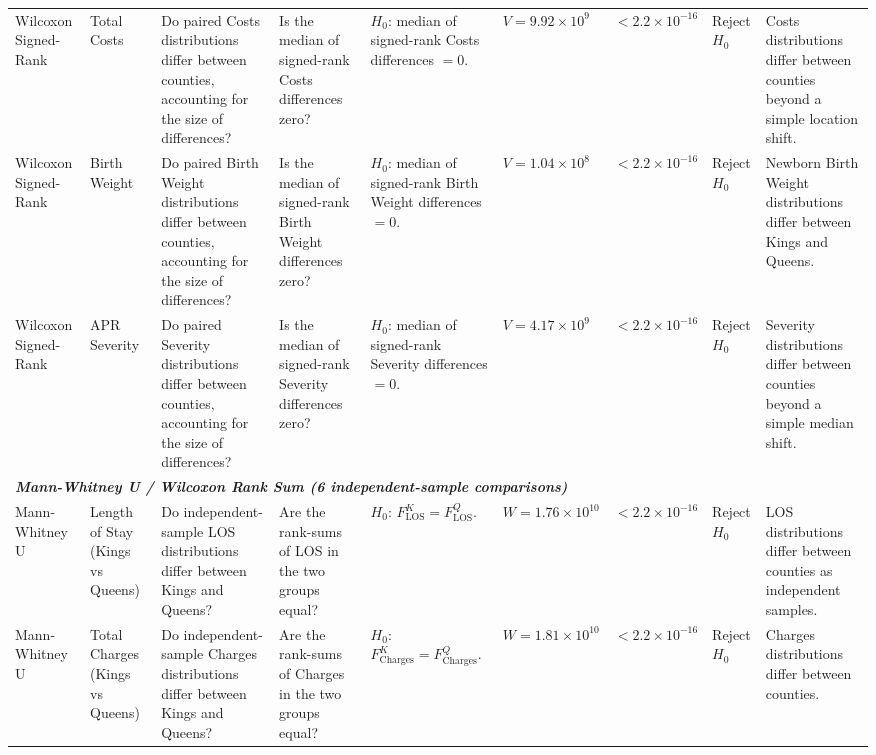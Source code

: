 \documentclass[12pt]{article}
\begin{document}
\begin{landscape}
\begin{scriptsize}
\begin{longtable}{p{2.0cm} p{2.4cm} p{3.0cm} p{2.7cm} p{2.5cm} p{1.7cm} p{1.3cm} p{1.3cm} p{3.0cm}}
Wilcoxon Signed-Rank & Total Costs & Do paired Costs distributions differ between counties, accounting for the size of differences? & Is the median of signed-rank Costs differences zero? & $H_0$: median of signed-rank Costs differences $= 0$. & $V = 9.92 \times 10^{9}$ & $< 2.2 \times 10^{-16}$ & Reject $H_0$ & Costs distributions differ between counties beyond a simple location shift. \\

Wilcoxon Signed-Rank & Birth Weight & Do paired Birth Weight distributions differ between counties, accounting for the size of differences? & Is the median of signed-rank Birth Weight differences zero? & $H_0$: median of signed-rank Birth Weight differences $= 0$. & $V = 1.04 \times 10^{8}$ & $< 2.2 \times 10^{-16}$ & Reject $H_0$ & Newborn Birth Weight distributions differ between Kings and Queens. \\

Wilcoxon Signed-Rank & APR Severity & Do paired Severity distributions differ between counties, accounting for the size of differences? & Is the median of signed-rank Severity differences zero? & $H_0$: median of signed-rank Severity differences $= 0$. & $V = 4.17 \times 10^{9}$ & $< 2.2 \times 10^{-16}$ & Reject $H_0$ & Severity distributions differ between counties beyond a simple median shift. \\

\midrule
\multicolumn{9}{l}{\textit{\textbf{Mann-Whitney U / Wilcoxon Rank Sum (6 independent-sample comparisons)}}} \\

Mann-Whitney U & Length of Stay (Kings vs Queens) & Do independent-sample LOS distributions differ between Kings and Queens? & Are the rank-sums of LOS in the two groups equal? & $H_0$: $F_{\mathrm{LOS}}^{K} = F_{\mathrm{LOS}}^{Q}$. & $W = 1.76 \times 10^{10}$ & $< 2.2 \times 10^{-16}$ & Reject $H_0$ & LOS distributions differ between counties as independent samples. \\

Mann-Whitney U & Total Charges (Kings vs Queens) & Do independent-sample Charges distributions differ between Kings and Queens? & Are the rank-sums of Charges in the two groups equal? & $H_0$: $F_{\mathrm{Charges}}^{K} = F_{\mathrm{Charges}}^{Q}$. & $W = 1.81 \times 10^{10}$ & $< 2.2 \times 10^{-16}$ & Reject $H_0$ & Charges distributions differ between counties. \\


\end{longtable}
\end{scriptsize}
\end{landscape}
\end{document}

